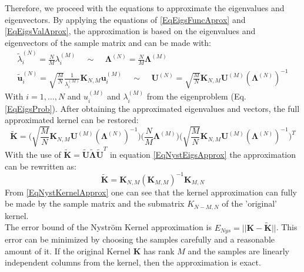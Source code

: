 Therefore, we proceed with the equations to approximate the eigenvalues and eigenvectors.
By applying the equations of \eqref{EqEigsFuncAprox} and \eqref{EqEigsValAprox}, the approximation is based on the eigenvalues and eigenvectors of the sample matrix and can be made with:\cite{Zhang.2008}
\begin{equation}\label{EqNystEigsApprox}
	\begin{gathered}
			\tilde{\lambda}_i^{(N)} = \frac{N}{M}\lambda_i^{(M)} \>\>\>\>\> \sim \>\>\>\>\> \boldsymbol{\Lambda}^{(N)} =\frac{N}{M}\boldsymbol{\Lambda}^{(M)}\\
			\tilde{\mathbf{u}}_i^{(N)} = \sqrt{\frac{M}{N}}\frac{1}{\lambda_i^{(M)}}\mathbf{K}_{N,M}\mathbf{u}_i^{(M)}\>\>\>\>\> \sim \>\>\>\>\> \mathbf{U}^{(N)} = \sqrt{\frac{M}{N}}\mathbf{K}_{N,M}\mathbf{U}^{(M)}(\boldsymbol{\Lambda}^{(N)})^{-1}
	\end{gathered}
\end{equation}
With $i=1,\dots,N$ and $u_i^{(M)}$ and $\lambda_i^{(M)}$ from the eigenproblem (Eq. \eqref{EqEigsProb}).
After obtaining the approximated eigenvalues and vectors, the full approximated kernel can be restored:\cite{Williams.2000}\cite{Zhang.2008}
\begin{equation}\label{EqNystKernelEigsApprox}
	\tilde{\mathbf{K}} = \bigg(\sqrt{\frac{M}{N}}\mathbf{K}_{N,M}\mathbf{U}^{(M)}(\boldsymbol{\Lambda}^{(N)})^{-1}\bigg)\bigg(\frac{N}{M}\boldsymbol{\Lambda}^{(M)}\bigg)\bigg(\sqrt{\frac{M}{N}}\mathbf{K}_{N,M}\mathbf{U}^{(M)}(\boldsymbol{\Lambda}^{(N)})^{-1}\bigg)^T 
\end{equation}
With the use of $\tilde{\mathbf{K}} = \tilde{\mathbf{U}}\tilde{\mathbf{\Lambda}}\tilde{\mathbf{U}}^T$ in equation \eqref{EqNystEigsApprox} the approximation can be rewritten as:
\begin{equation}\label{EqNystKernelApprox}
		\tilde{\mathbf{K}} = \mathbf{K}_{N,M}(\mathbf{K}_{M,M})^{-1}\mathbf{K}_{M,N}
\end{equation}
From \eqref{EqNystKernelApprox} one can see that the kernel approximation can fully be made by the sample matrix and the submatrix $K_{N-M, N}$ of the 'original' kernel.\cite{Williams.2000}\\
The error bound of the Nyström Kernel approximation is $E_{Nys}=||\mathbf{K}-\tilde{\mathbf{K}}||$.\cite{He.2017}
This error can be minimized by choosing the samples carefully and a reasonable amount of it.
If the original Kernel $\mathbf{K}$ has rank $M$ and the samples are linearly independent columns from the kernel, then the approximation is exact.
